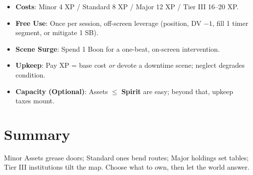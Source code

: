 \begin{tcolorbox}[colback=blue!5!white,colframe=blue!75!black,title=Asset Quick Reference,fonttitle=\bfseries,breakable]
\begin{itemize}
  \item \textbf{Costs}: Minor 4 XP / Standard 8 XP / Major 12 XP / Tier III 16--20 XP.
  \item \textbf{Free Use}: Once per session, off-screen leverage (position, DV $-1$, fill 1 timer segment, or mitigate 1 SB).
  \item \textbf{Scene Surge}: Spend 1 Boon for a one-beat, on-screen intervention.
  \item \textbf{Upkeep}: Pay XP = base cost \emph{or} devote a downtime scene; neglect degrades condition.
  \item \textbf{Capacity (Optional)}: Assets $\leq$ \textbf{Spirit} are easy; beyond that, upkeep taxes mount.
\end{itemize}
\end{tcolorbox}

\section{Summary}
Minor Assets grease doors; Standard ones bend routes; Major holdings set tables; Tier III institutions tilt the map. Choose what to own, then let the world answer.

